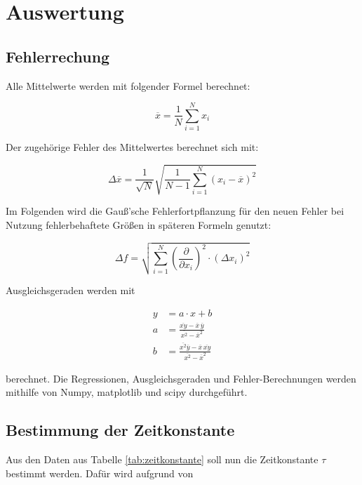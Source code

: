 \section{Auswertung}
\label{sec:Auswertung}

\subsection{Fehlerrechung}
\label{sec:Fehlerrechnung}

Alle Mittelwerte werden mit folgender Formel berechnet:

\begin{equation}
  \label{eqn:15}
  \overline{x} = \frac{1}{N} \sum_{i=1}^N x_i
\end{equation}

Der zugehörige Fehler des Mittelwertes berechnet sich mit:

\begin{equation}
  \label{eqn:16}
  \Delta \overline{x} = \frac{1}{\sqrt{N}} \sqrt{\frac{1}{N-1} \sum_{i=1}^N (x_i - \overline{x})^2}
\end{equation}

Im Folgenden wird die Gauß'sche Fehlerfortpflanzung für den neuen Fehler bei Nutzung fehlerbehaftete Größen in späteren Formeln genutzt:

\begin{equation}
  \label{eqn:17}
  \Delta f = \sqrt{ \sum_{i=1}^N (\frac{\partial}{\partial x_i})^2 \cdot (\Delta x_i)^2}
\end{equation}

Ausgleichsgeraden werden mit

\begin{align}
  y &= a \cdot x + b \\
  a &= \frac{\overline{xy}-\overline{x} \, \overline{y}}{\overline{x^2}-\overline{x}^2} \\
  b &= \frac{\overline{x^2}\overline{y}-\overline{x} \, \overline{xy}}{\overline{x^2}-\overline{x}^2}
\end{align}

berechnet. Die Regressionen, Ausgleichsgeraden und Fehler-Berechnungen werden mithilfe von Numpy, matplotlib und scipy durchgeführt.

\subsection{Bestimmung der Zeitkonstante}
\label{Zeitkonstante}

Aus den Daten aus Tabelle \ref{tab:zeitkonstante} soll nun die Zeitkonstante $\tau$ bestimmt werden.
Dafür wird aufgrund von


